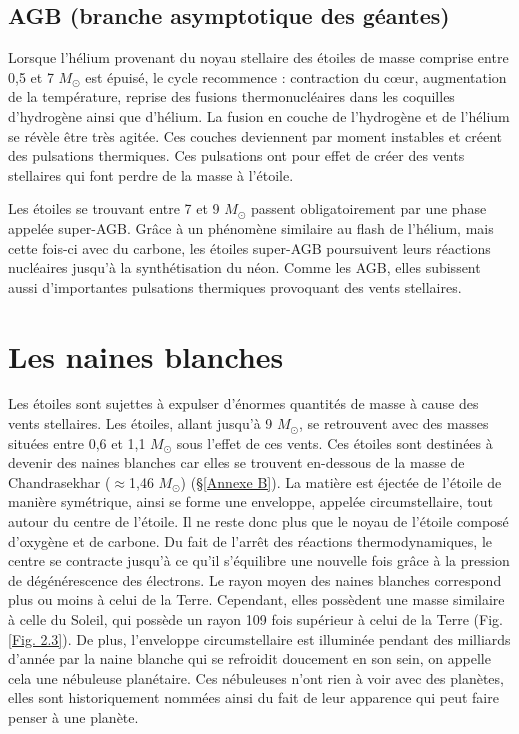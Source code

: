\subsection{AGB (branche asymptotique des géantes)}\label{2.2.2}

Lorsque l'hélium provenant du noyau stellaire des étoiles de masse comprise entre 0,5 et 7 $M_\odot$ est épuisé, le cycle recommence : contraction du cœur, augmentation de la température, reprise des fusions thermonucléaires dans les coquilles d’hydrogène ainsi que d’hélium. La fusion en couche de l’hydrogène et de l’hélium se révèle être très agitée. Ces couches deviennent par moment instables et créent des pulsations thermiques. Ces pulsations ont pour effet de créer des vents stellaires qui font perdre de la masse à l’étoile.\smallskip

Les étoiles se trouvant entre 7 et 9 $M_\odot$ passent obligatoirement par une phase appelée super-AGB. Grâce à un phénomène similaire au flash de l'hélium, mais cette fois-ci avec du carbone, les étoiles super-AGB poursuivent leurs réactions nucléaires jusqu'à la synthétisation du néon. Comme les AGB, elles subissent aussi d'importantes pulsations thermiques provoquant des vents stellaires.

\section{Les naines blanches}\label{2.3}

Les étoiles sont sujettes à expulser d’énormes quantités de masse à cause des vents stellaires. Les étoiles, allant jusqu’à 9 $M_\odot$, se retrouvent avec des masses situées entre 0,6 et 1,1 $M_\odot$ sous l’effet de ces vents. Ces étoiles sont destinées à devenir des naines blanches car elles se trouvent en-dessous de la masse de Chandrasekhar ($\approx$1,46 $M_\odot$) (§\ref{Annexe B}). La matière est éjectée de l’étoile de manière symétrique, ainsi se forme une enveloppe, appelée circumstellaire, tout autour du centre de l’étoile. Il ne reste donc plus que le noyau de l’étoile composé d’oxygène et de carbone. Du fait de l’arrêt des réactions thermodynamiques, le centre se contracte jusqu’à ce qu’il s’équilibre une nouvelle fois grâce à la pression de dégénérescence des électrons. Le rayon moyen des naines blanches correspond plus ou moins à celui de la Terre. Cependant, elles possèdent une masse similaire à celle du Soleil, qui possède un rayon 109 fois supérieur à celui de la Terre (Fig. \ref{Fig. 2.3}). De plus, l’enveloppe circumstellaire est illuminée pendant des milliards d’année par la naine blanche qui se refroidit doucement en son sein, on appelle cela une nébuleuse planétaire. Ces nébuleuses n’ont rien à voir avec des planètes, elles sont historiquement nommées ainsi du fait de leur apparence qui peut faire penser à une planète.\newpage 

